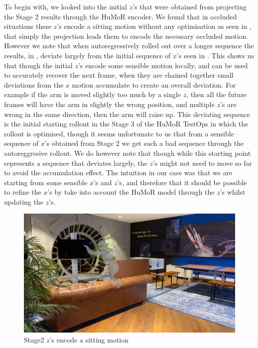 To begin with, we looked into the initial $z$'s that were obtained from projecting the Stage 2 results through the HuMoR encoder. We found that in occluded situations these $z$'s encode a sitting motion without any optimisation as seen in , that simply the projection leads them to encode the necessary occluded motion. However we note that when autoregressively rolled out over a longer sequence the results, in , deviate largely from the initial sequence of $x$'s seen in . This shows us that though the initial $z$'s encode some sensible motion locally, and can be used to accurately recover the next frame, when they are chained together small deviations from the $x$ motion accumulate to create an overall deviation. For example if the arm is moved slightly too much by a single $z$, then all the future frames will have the arm in slightly the wrong position, and multiple $z$'s are wrong in the same direction, then the arm will raise up. This deviating sequence is the initial starting rollout in the Stage 3 of the HuMoR TestOps in which the rollout is optimised, though it seems unfortunate to us that from a sensible sequence of $x$'s obtained from Stage 2 we get such a bad sequence through the autoreggresive rollout. We do however note that though while this starting point represents a sequence that deviates largely, the $z$'s might not need to move so far to avoid the accumulation effect. The intuition in our case was that we are starting from some sensible $x$'s and $z$'s, and therefore that it should be possible to refine the $x$'s by take into account the HuMoR model through the $z$'s whilst updating the $z$'s. 

\begin{figure}[h!]
    \centering
    \includegraphics[width=1\textwidth]{Figures/humor/improvement/Rollout_stage_2/sitting_clip/rollout_sitting_example/frame_00000078.jpg}
    \caption{Stage2 $z$'s encode a sitting motion}
    \label{fig:humor_stage_2_rollout_sitting}
\end{figure}


